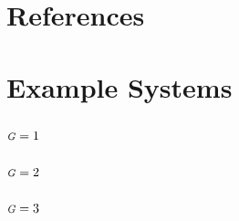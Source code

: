 \documentclass[10pt]{article}
\numberwithin{equation}{section}
\newcommand{\G}{{\mbox{\footnotesize{\textit{G}}}}}
\begin{document}
\section{References}\label{s:references}
\printbibliography[heading=none]
\clearpage\appendix
\section{Example Systems}\label{a:example-systems}
\subsection{$\G = 1$}

\subsection{$\G = 2$}

\subsection{$\G = 3$}

%
\end{document}

